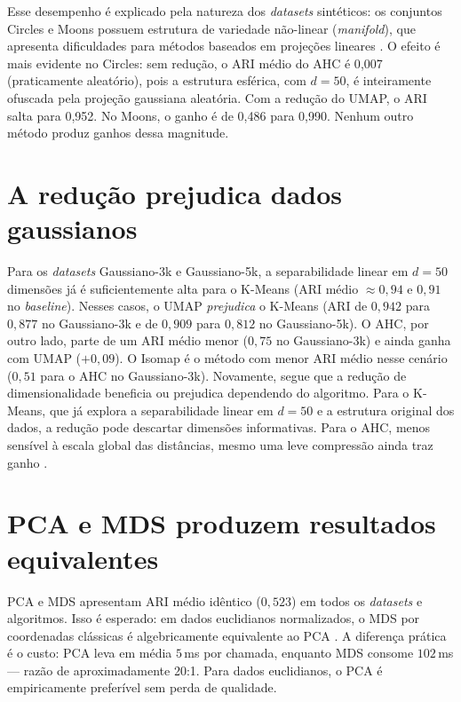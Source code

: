 \documentclass[12pt,a4paper]{report}
\begin{document}
Esse desempenho é explicado pela natureza dos \textit{datasets} sintéticos: os
conjuntos Circles e Moons possuem estrutura de variedade não-linear
(\textit{manifold}), que apresenta dificuldades para métodos baseados em
projeções lineares \citep{tenenbaum2000,mcinnes2018}. O efeito é mais evidente no Circles: sem redução, o ARI
médio do AHC é 0{,}007 (praticamente aleatório), pois a estrutura esférica,
com $d = 50$, é inteiramente ofuscada pela projeção gaussiana aleatória.
Com a redução do UMAP, o ARI salta para 0{,}952. No Moons, o ganho é de
0{,}486 para 0{,}990. Nenhum outro método produz ganhos dessa magnitude.

\section*{A redução prejudica dados gaussianos}

Para os \textit{datasets} Gaussiano-3k e Gaussiano-5k, a separabilidade
linear em $d = 50$ dimensões já é suficientemente alta para o K-Means (ARI médio
$\approx 0{,}94$ e $0{,}91$ no \textit{baseline}). Nesses casos, o UMAP
\textit{prejudica} o K-Means (ARI de $0{,}942$ para $0{,}877$ no
Gaussiano-3k e de $0{,}909$ para $0{,}812$ no Gaussiano-5k). O AHC, por
outro lado, parte de um ARI médio menor ($0{,}75$ no Gaussiano-3k) e ainda
ganha com UMAP ($+0{,}09$). O Isomap é o método com menor ARI médio nesse
cenário ($0{,}51$ para o AHC no Gaussiano-3k). Novamente, segue que a redução
de dimensionalidade beneficia ou prejudica dependendo do algoritmo. Para o
K-Means, que já explora a separabilidade linear em $d = 50$ e a estrutura
original dos dados, a redução pode descartar dimensões informativas. Para o
AHC, menos sensível à escala global das distâncias, mesmo uma leve compressão
ainda traz ganho \citep{ding2004,murtagh2014}.

\section*{PCA e MDS produzem resultados equivalentes}

PCA e MDS apresentam ARI médio idêntico ($0{,}523$) em todos os
\textit{datasets} e algoritmos. Isso é esperado: em dados euclidianos
normalizados, o MDS por coordenadas clássicas é algebricamente equivalente
ao PCA \citep{gower1966}. A diferença prática é o custo: PCA leva em média $5$\,ms por
chamada, enquanto MDS consome $102$\,ms --- razão de aproximadamente 20:1.
Para dados euclidianos, o PCA é empiricamente preferível sem perda de
qualidade.
\end{document}
